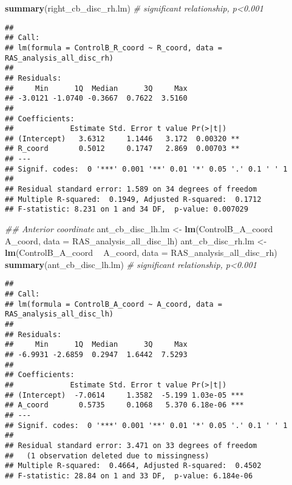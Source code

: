 \documentclass[
]{article}
\newenvironment{Shaded}{\begin{snugshade}}{\end{snugshade}}
\newcommand{\CommentTok}[1]{\textcolor[rgb]{0.56,0.35,0.01}{\textit{#1}}}
\newcommand{\DataTypeTok}[1]{\textcolor[rgb]{0.13,0.29,0.53}{#1}}
\newcommand{\KeywordTok}[1]{\textcolor[rgb]{0.13,0.29,0.53}{\textbf{#1}}}
\newcommand{\NormalTok}[1]{#1}
\newcommand{\OperatorTok}[1]{\textcolor[rgb]{0.81,0.36,0.00}{\textbf{#1}}}
\newcommand{\StringTok}[1]{\textcolor[rgb]{0.31,0.60,0.02}{#1}}
\begin{document}
\begin{Shaded}
\begin{Highlighting}[]
\KeywordTok{summary}\NormalTok{(right_cb_disc_rh.lm) }\CommentTok{# significant relationship, p<0.001}
\end{Highlighting}
\end{Shaded}

\begin{verbatim}
## 
## Call:
## lm(formula = ControlB_R_coord ~ R_coord, data = RAS_analysis_all_disc_rh)
## 
## Residuals:
##     Min      1Q  Median      3Q     Max 
## -3.0121 -1.0740 -0.3667  0.7622  3.5160 
## 
## Coefficients:
##             Estimate Std. Error t value Pr(>|t|)   
## (Intercept)   3.6312     1.1446   3.172  0.00320 **
## R_coord       0.5012     0.1747   2.869  0.00703 **
## ---
## Signif. codes:  0 '***' 0.001 '**' 0.01 '*' 0.05 '.' 0.1 ' ' 1
## 
## Residual standard error: 1.589 on 34 degrees of freedom
## Multiple R-squared:  0.1949, Adjusted R-squared:  0.1712 
## F-statistic: 8.231 on 1 and 34 DF,  p-value: 0.007029
\end{verbatim}

\begin{Shaded}
\begin{Highlighting}[]
\CommentTok{## Anterior coordinate}
\NormalTok{ant_cb_disc_lh.lm <-}\StringTok{ }\KeywordTok{lm}\NormalTok{(ControlB_A_coord }\OperatorTok{~}\StringTok{ }\NormalTok{A_coord, }\DataTypeTok{data =}\NormalTok{ RAS_analysis_all_disc_lh)}
\NormalTok{ant_cb_disc_rh.lm <-}\StringTok{ }\KeywordTok{lm}\NormalTok{(ControlB_A_coord }\OperatorTok{~}\StringTok{ }\NormalTok{A_coord, }\DataTypeTok{data =}\NormalTok{ RAS_analysis_all_disc_rh)}
\KeywordTok{summary}\NormalTok{(ant_cb_disc_lh.lm) }\CommentTok{# significant relationship, p<0.001}
\end{Highlighting}
\end{Shaded}

\begin{verbatim}
## 
## Call:
## lm(formula = ControlB_A_coord ~ A_coord, data = RAS_analysis_all_disc_lh)
## 
## Residuals:
##     Min      1Q  Median      3Q     Max 
## -6.9931 -2.6859  0.2947  1.6442  7.5293 
## 
## Coefficients:
##             Estimate Std. Error t value Pr(>|t|)    
## (Intercept)  -7.0614     1.3582  -5.199 1.03e-05 ***
## A_coord       0.5735     0.1068   5.370 6.18e-06 ***
## ---
## Signif. codes:  0 '***' 0.001 '**' 0.01 '*' 0.05 '.' 0.1 ' ' 1
## 
## Residual standard error: 3.471 on 33 degrees of freedom
##   (1 observation deleted due to missingness)
## Multiple R-squared:  0.4664, Adjusted R-squared:  0.4502 
## F-statistic: 28.84 on 1 and 33 DF,  p-value: 6.184e-06
\end{verbatim}
\end{document}
